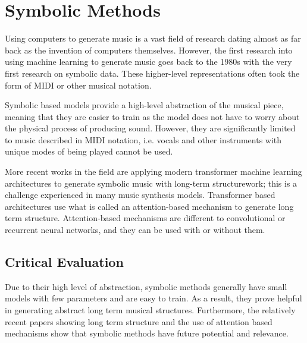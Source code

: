 \section{Symbolic Methods}

Using computers to generate music is a vast field of research dating almost as far back as the invention of computers themselves\cite{Hiller1958Musical}. However, the first research into using machine learning to generate music goes back to the 1980s\cite{ConnectionistComposition}\cite{GradientDescentLearning} with the very first research on symbolic data. These higher-level representations often took the form of MIDI or other musical notation.

Symbolic based models provide a high-level abstraction of the musical piece, meaning that they are easier to train as the model does not have to worry about the physical process of producing sound. However, they are significantly limited to music described in MIDI notation, i.e. vocals and other instruments with unique modes of being played cannot be used.

\vspace{0.5cm}
\vspace{0.5cm}

More recent works in the field are applying modern transformer machine learning architectures to generate symbolic music with long-term structurework\cite{LongTermStructure}; this is a challenge experienced in many music synthesis models. Transformer based architectures use what is called an attention-based mechanism to generate long term structure\cite{Attention}. Attention-based mechanisms are different to convolutional or recurrent neural networks, and they can be used with or without them.

\subsection{Critical Evaluation}

Due to their high level of abstraction, symbolic methods generally have small models with few parameters and are easy to train. As a result, they prove helpful in generating abstract long term musical structures. Furthermore, the relatively recent papers showing long term structure\cite{LongTermStructure} and the use of attention based mechanisms\cite{Attention} show that symbolic methods have future potential and relevance.

